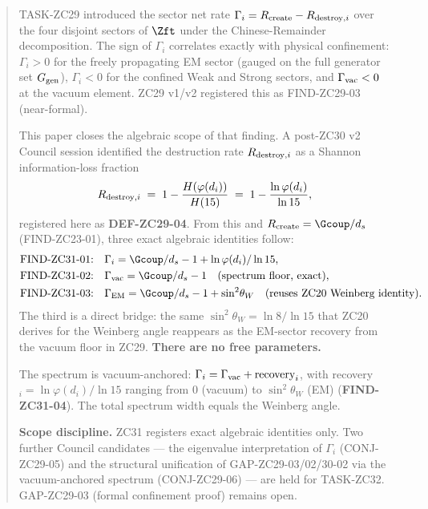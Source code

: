 \documentclass[12pt, a4paper]{article}
\begin{document}
\begin{abstract}
\sloppy
TASK-ZC29 introduced the sector net rate
$\Gamma_i = R_{\rm create} - R_{{\rm destroy},i}$ over the four
disjoint sectors of $\Zft$ under the Chinese-Remainder
decomposition. The sign of $\Gamma_i$ correlates exactly with
physical confinement: $\Gamma_i > 0$ for the freely propagating
EM sector (gauged on the full generator set $G_{\rm gen}$),
$\Gamma_i < 0$ for the confined Weak and Strong sectors, and
$\Gamma_{\rm vac} < 0$ at the vacuum element. ZC29 v1/v2
registered this as FIND-ZC29-03 (near-formal).

This paper closes the algebraic scope of that finding. A
post-ZC30 v2 Council session identified the destruction rate
$R_{{\rm destroy},i}$ as a Shannon information-loss fraction
\[
  R_{{\rm destroy},i} \;=\; 1 - \frac{H(\varphi(d_i))}{H(15)}
                       \;=\; 1 - \frac{\ln \varphi(d_i)}{\ln 15},
\]
registered here as \textbf{DEF-ZC29-04}. From this and
$R_{\rm create} = \Gcoup/d_s$ (FIND-ZC23-01), three exact
algebraic identities follow:
\begin{align*}
  \text{FIND-ZC31-01:}\quad
    & \Gamma_i = \Gcoup/d_s - 1 + \ln \varphi(d_i)/\ln 15,\\
  \text{FIND-ZC31-02:}\quad
    & \Gamma_{\rm vac} = \Gcoup/d_s - 1
      \quad(\text{spectrum floor, exact}),\\
  \text{FIND-ZC31-03:}\quad
    & \Gamma_{\rm EM}  = \Gcoup/d_s - 1 + \sin^2\!\theta_W
      \quad(\text{reuses ZC20 Weinberg identity}).
\end{align*}
The third is a direct bridge: the same
$\sin^2\!\theta_W = \ln 8/\ln 15$ that ZC20 derives for the
Weinberg angle reappears as the EM-sector recovery from the
vacuum floor in ZC29. \textbf{There are no free parameters.}

The spectrum is vacuum-anchored: $\Gamma_i = \Gamma_{\rm vac} +
\text{recovery}_i$, with recovery$_i = \ln\varphi(d_i)/\ln 15$
ranging from $0$ (vacuum) to $\sin^2\!\theta_W$ (EM)
(\textbf{FIND-ZC31-04}). The total spectrum width equals the
Weinberg angle.

\textbf{Scope discipline.} ZC31 registers exact algebraic
identities only. Two further Council candidates --- the
eigenvalue interpretation of $\Gamma_i$ (CONJ-ZC29-05) and the
structural unification of GAP-ZC29-03/02/30-02 via the
vacuum-anchored spectrum (CONJ-ZC29-06) --- are held for
TASK-ZC32. GAP-ZC29-03 (formal confinement proof) remains
open.
\end{abstract}
\end{document}
